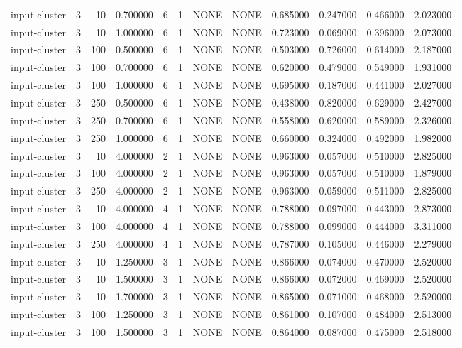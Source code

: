 \begin{tabular}{lrrrllllrrrr}
input-cluster & 3 & 10 & 0.700000 & 6 & 1 & NONE & NONE & 0.685000 & 0.247000 & 0.466000 & 2.023000 \\
input-cluster & 3 & 10 & 1.000000 & 6 & 1 & NONE & NONE & 0.723000 & 0.069000 & 0.396000 & 2.073000 \\
input-cluster & 3 & 100 & 0.500000 & 6 & 1 & NONE & NONE & 0.503000 & 0.726000 & 0.614000 & 2.187000 \\
input-cluster & 3 & 100 & 0.700000 & 6 & 1 & NONE & NONE & 0.620000 & 0.479000 & 0.549000 & 1.931000 \\
input-cluster & 3 & 100 & 1.000000 & 6 & 1 & NONE & NONE & 0.695000 & 0.187000 & 0.441000 & 2.027000 \\
input-cluster & 3 & 250 & 0.500000 & 6 & 1 & NONE & NONE & 0.438000 & 0.820000 & 0.629000 & 2.427000 \\
input-cluster & 3 & 250 & 0.700000 & 6 & 1 & NONE & NONE & 0.558000 & 0.620000 & 0.589000 & 2.326000 \\
input-cluster & 3 & 250 & 1.000000 & 6 & 1 & NONE & NONE & 0.660000 & 0.324000 & 0.492000 & 1.982000 \\
input-cluster & 3 & 10 & 4.000000 & 2 & 1 & NONE & NONE & 0.963000 & 0.057000 & 0.510000 & 2.825000 \\
input-cluster & 3 & 100 & 4.000000 & 2 & 1 & NONE & NONE & 0.963000 & 0.057000 & 0.510000 & 1.879000 \\
input-cluster & 3 & 250 & 4.000000 & 2 & 1 & NONE & NONE & 0.963000 & 0.059000 & 0.511000 & 2.825000 \\
input-cluster & 3 & 10 & 4.000000 & 4 & 1 & NONE & NONE & 0.788000 & 0.097000 & 0.443000 & 2.873000 \\
input-cluster & 3 & 100 & 4.000000 & 4 & 1 & NONE & NONE & 0.788000 & 0.099000 & 0.444000 & 3.311000 \\
input-cluster & 3 & 250 & 4.000000 & 4 & 1 & NONE & NONE & 0.787000 & 0.105000 & 0.446000 & 2.279000 \\
input-cluster & 3 & 10 & 1.250000 & 3 & 1 & NONE & NONE & 0.866000 & 0.074000 & 0.470000 & 2.520000 \\
input-cluster & 3 & 10 & 1.500000 & 3 & 1 & NONE & NONE & 0.866000 & 0.072000 & 0.469000 & 2.520000 \\
input-cluster & 3 & 10 & 1.700000 & 3 & 1 & NONE & NONE & 0.865000 & 0.071000 & 0.468000 & 2.520000 \\
input-cluster & 3 & 100 & 1.250000 & 3 & 1 & NONE & NONE & 0.861000 & 0.107000 & 0.484000 & 2.513000 \\
input-cluster & 3 & 100 & 1.500000 & 3 & 1 & NONE & NONE & 0.864000 & 0.087000 & 0.475000 & 2.518000 \\

\end{tabular}
